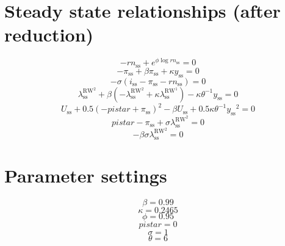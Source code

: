 \section{Steady state relationships (after reduction)}

\begin{equation}
-{r\!n}_\mathrm{ss} + e^{{\phi} {\log{{r\!n}_\mathrm{ss}}}} = 0
\end{equation}
\begin{equation}
-\pi_\mathrm{ss} + {\beta} {\pi_\mathrm{ss}} + {\kappa} {y_\mathrm{ss}} = 0
\end{equation}
\begin{equation}
-{\sigma} \left(i_\mathrm{ss} - \pi_\mathrm{ss} - {r\!n}_\mathrm{ss}\right) = 0
\end{equation}
\begin{equation}
\lambda^{\mathrm{RW}^{\mathrm{2}}}_\mathrm{ss} + {\beta} \left(-\lambda^{\mathrm{RW}^{\mathrm{2}}}_\mathrm{ss} + {\kappa} {\lambda^{\mathrm{RW}^{\mathrm{1}}}_\mathrm{ss}}\right) - {\kappa} {\theta}^{-1} {y_\mathrm{ss}} = 0
\end{equation}
\begin{equation}
U_\mathrm{ss} + 0.5\left(-{p\!i\!s\!t\!a\!r} + \pi_\mathrm{ss}\right)^{2} - {\beta} {U_\mathrm{ss}} + 0.5{\kappa} {\theta}^{-1} {y_\mathrm{ss}}^{2} = 0
\end{equation}
\begin{equation}
{p\!i\!s\!t\!a\!r} - \pi_\mathrm{ss} + {\sigma} {\lambda^{\mathrm{RW}^{\mathrm{2}}}_\mathrm{ss}} = 0
\end{equation}
\begin{equation}
-{\beta} {\sigma} {\lambda^{\mathrm{RW}^{\mathrm{2}}}_\mathrm{ss}} = 0
\end{equation}






\section{Parameter settings}

\begin{equation}
\beta = 0.99
\end{equation}
\begin{equation}
\kappa = 0.2465
\end{equation}
\begin{equation}
\phi = 0.95
\end{equation}
\begin{equation}
{p\!i\!s\!t\!a\!r} = 0
\end{equation}
\begin{equation}
\sigma = 1
\end{equation}
\begin{equation}
\theta = 6
\end{equation}


